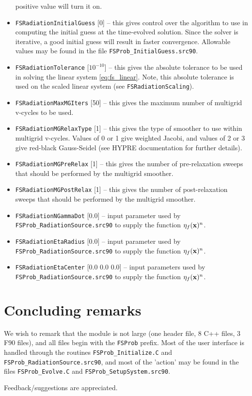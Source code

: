 \documentclass[letterpaper,10pt]{article}
\renewcommand{\(}{\left(}
\renewcommand{\)}{\right)}
\newcommand{\xvec}{{\bf x}}
\begin{document}
\begin{itemize}
  positive value will turn it on.
\item {\tt FSRadiationInitialGuess} [0] -- this gives control over the
  algorithm to use in computing the initial guess at the time-evolved
  solution.  Since the solver is iterative, a good initial guess will
  result in faster convergence.  Allowable values may be found in the
  file {\tt FSProb\_InitialGuess.src90}.
\item {\tt FSRadiationTolerance} [$10^{-10}$] -- this gives the
  absolute tolerance to be used in solving the linear system
  \eqref{eq:fs_linear}.  Note, this absolute tolerance is used on the
  scaled linear system (see {\tt FSRadiationScaling}).
\item {\tt FSRadiationMaxMGIters} [50] -- this gives the maximum
  number of multigrid v-cycles to be used.
\item {\tt FSRadiationMGRelaxType} [1] -- this gives the type of
  smoother to use within multigrid v-cycles.  Values of 0 or 1 give
  weighted Jacobi, and values of 2 or 3 give red-black Gauss-Seidel
  (see HYPRE documentation for further details).
\item {\tt FSRadiationMGPreRelax} [1] -- this gives the number of
  pre-relaxation sweeps that should be performed by the multigrid
  smoother. 
\item {\tt FSRadiationMGPostRelax} [1] -- this gives the number of
  post-relaxation sweeps that should be performed by the multigrid
  smoother. 
\item {\tt FSRadiationNGammaDot} [0.0] -- input parameter used by 
  {\tt FSProb\_RadiationSource.src90} to supply the function
  $\eta_f(\xvec)^n$. 
\item {\tt FSRadiationEtaRadius} [0.0] -- input parameter used by 
  {\tt FSProb\_RadiationSource.src90} to supply the function
  $\eta_f(\xvec)^n$. 
\item {\tt FSRadiationEtaCenter} [0.0 0.0 0.0] -- input parameters
  used by {\tt FSProb\_RadiationSource.src90} to supply the function
  $\eta_f(\xvec)^n$. 
\end{itemize}


\section{Concluding remarks}
\label{sec:conclusions}

We wish to remark that the module is not large (one header file, 8 C++
files, 3 F90 files), and all files begin with the {\tt FSProb}
prefix.  Most of the user interface is handled through the routines
{\tt FSProb\_Initialize.C} and {\tt FSProb\_RadiationSource.src90}, and
most of the 'action' may be found in the files {\tt FSProb\_Evolve.C}
and {\tt FSProb\_SetupSystem.src90}.  

Feedback/suggestions are appreciated.




\end{document}

